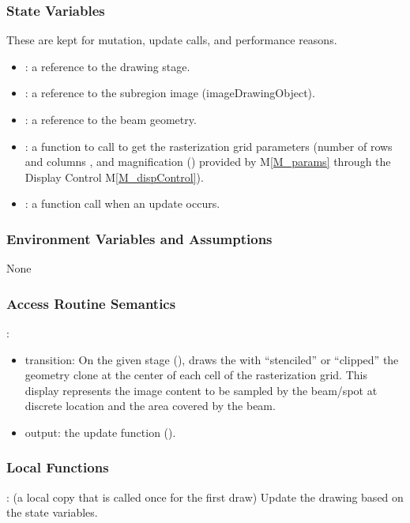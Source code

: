 \documentclass[12pt, titlepage]{article}
\newcommand{\mref}[1]{M\ref{#1}}
\begin{document}
\subsubsection{State Variables}
These are kept for mutation, update calls, and performance reasons.
\begin{itemize}
  \item {}: a reference to the drawing stage.
  \item {}: a reference to the subregion image (imageDrawingObject).
  \item {}: a reference to the beam geometry.
  \item {}: a function to call to get the rasterization
    grid parameters (number of rows  and columns ,
    and magnification () 
    provided by \mref{M_params}
    through the Display Control \mref{M_dispControl}).
  \item {}: a function call when an update occurs.
\end{itemize}

\subsubsection{Environment Variables and Assumptions}
None

\subsubsection{Access Routine Semantics}

\noindent {}:
\begin{itemize}
\item transition: On the given stage (),
  draws the  with ``stenciled''
  or ``clipped'' the  geometry clone at the center of each cell
  of the rasterization grid. This display represents
  the image content to be sampled by the beam/spot at discrete location
  and the area covered by the beam.
\item output: the update function ().
\end{itemize}

\subsubsection{Local Functions}
: (a local copy that is called once for the first draw)
  Update the drawing based on the state variables.
\end{document}
